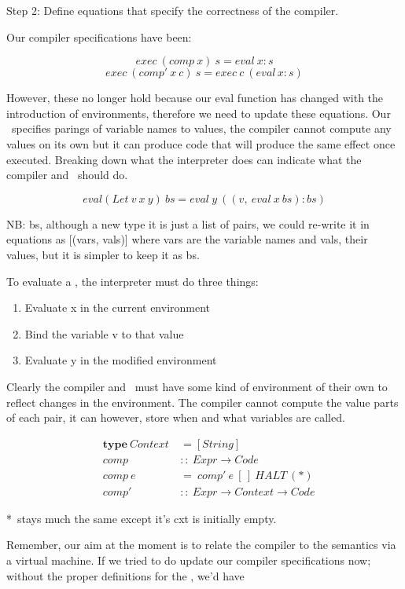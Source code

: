 \documentclass {article}
\begin{document}
Step 2: Define equations that specify the
	correctness of the compiler.

Our compiler specifications have been:

	\[ exec\  (comp\  x)\  s = eval\  x:s \]
	\[ exec\  (comp'\  x\  c)\ s = exec\  c\  (eval \, x:s) \]

However, these no longer hold
because our eval function has changed
with the introduction of environments,
therefore we need to update these equations.
\linebreak
Our \env\ specifies parings of 
variable names to values,
the compiler cannot compute any 
values on its own
but it can produce code that will
produce the same effect once executed.
Breaking down what the interpreter
does can indicate what the 
compiler and \vm\ should do.

\[eval(Let\ v\ x\ y)\ bs 
		= eval\ y\ ((v,\ eval\ x\ bs):bs) \]

NB: bs, although a new type it is just a list
of pairs, we could re-write it in equations as
[(vars, vals)] where vars are the variable names
and vals, their values,
but it is simpler to keep it as bs.

To evaluate a , the interpreter
must do three things:
\begin{enumerate}
	\item Evaluate x in the current environment
	\item Bind the variable v to that value
	\item Evaluate y in the modified environment
\end{enumerate}

Clearly the compiler and \vm\ must have some kind of
environment of their own to
reflect changes in the environment.
The compiler cannot compute the value
parts of each pair,
it can however, 
store when and what variables are called.

\begin{eqnarray*}
	&\textbf{type}\  Context\ &= [String] \\
	&comp &::\ Expr \rightarrow Code \\
	&comp\ e &=\ comp'\ e\ [\,]\ HALT\ (*)\\
	&comp' &::\ Expr \rightarrow Context \rightarrow Code
\end{eqnarray*}

*\comp\ stays much the same except it's cxt
	is initially empty.

Remember, our aim at the moment
is to relate the compiler to the
semantics via a virtual machine.
If we tried to do update our compiler 
specifications now; 
without the proper definitions
for the \vm, we'd have
\end{document}
